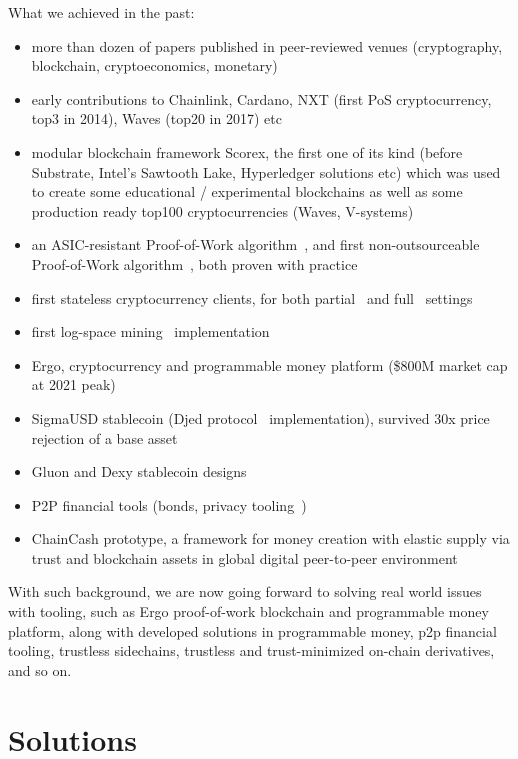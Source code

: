 \documentclass{llncs}   %
\begin{document}
What we achieved in the past:
\begin{itemize}
  \item  more than dozen of papers published in peer-reviewed venues (cryptography, blockchain, cryptoeconomics, monetary)
  \item  early contributions to Chainlink, Cardano, NXT (first PoS cryptocurrency, top3 in 2014), Waves (top20 in 2017) etc
  \item  modular blockchain framework Scorex, the first one of its kind (before Substrate, Intel's Sawtooth Lake, Hyperledger solutions etc) which was used to
create some educational / experimental blockchains as well as some production ready top100 cryptocurrencies (Waves, V-systems)
  \item  an ASIC-resistant Proof-of-Work algorithm~\cite{autolykos}, and first non-outsourceable Proof-of-Work algorithm~\cite{autolykos}, both proven with practice
  \item  first stateless cryptocurrency clients, for both partial~\cite{reyzin2017improving} and full~\cite{chepurnoy2018edrax} settings
  \item  first log-space mining~\cite{kiayias2021mining} implementation
  \item  Ergo, cryptocurrency and programmable money platform (\$800M market cap at 2021 peak)
  \item  SigmaUSD stablecoin (Djed protocol~\cite{zahnentferner2021djed} implementation), survived 30x price rejection of a base asset
  \item  Gluon and Dexy stablecoin designs
  \item  P2P financial tools (bonds, privacy tooling~\cite{chepurnoy2020zerojoin})
  \item  ChainCash prototype, a framework for money creation with elastic supply via trust and blockchain assets in
  global digital peer-to-peer environment~\cite{chaincash}
\end{itemize}

With such background, we are now going forward to solving real world issues with tooling, such as Ergo proof-of-work blockchain and programmable money platform, along with developed solutions in programmable money,
p2p financial tooling, trustless sidechains, trustless and trust-minimized on-chain derivatives, and so on.

\section{Solutions}
\label{sec-roadmap}
\end{document}
